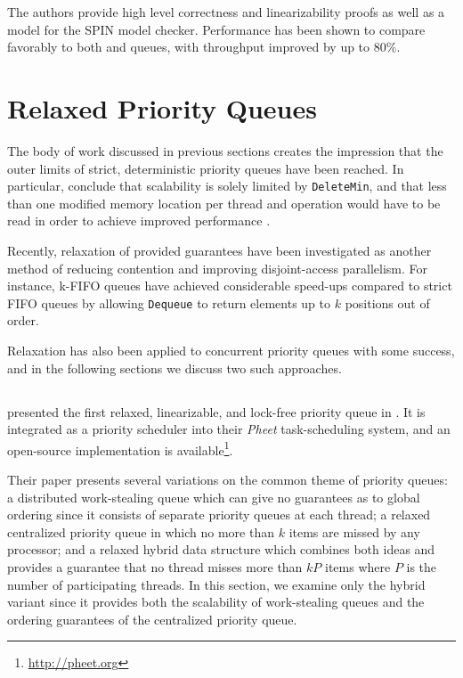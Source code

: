 \documentclass[a4paper,10pt]{article}
\begin{document}
The authors provide high level correctness and linearizability proofs as well as a model for the
SPIN model checker. Performance has been shown to compare favorably to both
\citeauthor{sundell2003fast} and \citeauthor{shavit2000skiplist} queues, with throughput improved by
up to $80\%$.

\section{Relaxed Priority Queues}

The body of work discussed in previous sections
creates the impression that the outer limits of strict, deterministic priority queues have been reached.
In particular, \citeauthor{linden2013skiplist} conclude that scalability is solely limited by \lstinline|DeleteMin|,
and that less than one modified memory location per thread and operation would have to be read
in order to achieve improved performance \cite{linden2013skiplist}.

Recently, relaxation of provided guarantees have been investigated as another method of reducing
contention and improving disjoint-access parallelism.
For instance, k-FIFO queues \cite{kirsch2012fast} have achieved considerable
speed-ups compared to strict FIFO queues by allowing {\lstset{breaklines,breakatwhitespace} \lstinline|Dequeue|} to return elements
up to $k$ positions out of order.

Relaxation has also been applied to concurrent priority queues with some success, and in the following
sections we discuss two such approaches.

\subsection{\citeauthor{wimmer2013data}} \label{sec:wimmer}

\citeauthor{wimmer2013data} presented the first relaxed, linearizable, and lock-free priority queue
in \cite{wimmer2013data}. It is integrated as a priority scheduler into their \emph{Pheet} task-scheduling
system, and an open-source implementation is available\footnote{\url{http://pheet.org}}.

Their paper presents several variations on the common theme of priority queues: a distributed work-stealing
queue which can give no guarantees as to global ordering since it consists of separate priority queues
at each thread; a relaxed centralized priority queue in which no more than $k$ items are missed
by any processor; and a relaxed hybrid data structure which combines both ideas and provides
a guarantee that no thread misses more than $kP$ items where $P$ is the number of participating threads.
In this section, we examine only the hybrid variant since it provides both the scalability of work-stealing
queues and the ordering guarantees of the centralized priority queue.
\end{document}
